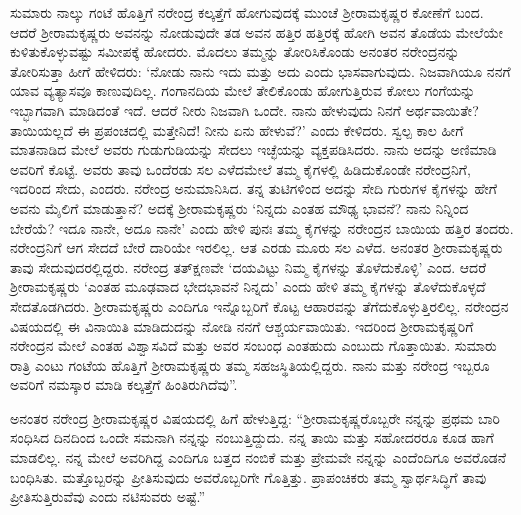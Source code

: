 ಸುಮಾರು ನಾಲ್ಕು ಗಂಟೆ ಹೊತ್ತಿಗೆ ನರೇಂದ್ರ ಕಲ್ಕತ್ತೆಗೆ ಹೋಗುವುದಕ್ಕೆ ಮುಂಚೆ ಶ‍್ರೀರಾಮಕೃಷ್ಣರ ಕೋಣೆಗೆ ಬಂದ. ಆದರೆ ಶ‍್ರೀರಾಮಕೃಷ್ಣರು ಅವನನ್ನು ನೋಡುವುದೇ ತಡ ಅವನ ಹತ್ತಿರ ಹತ್ತಿರಕ್ಕೆ ಹೋಗಿ ಅವನ ತೊಡೆಯ ಮೇಲೆಯೇ ಕುಳಿತುಕೊಳ್ಳುವಷ್ಟು ಸಮೀಪಕ್ಕೆ ಹೋದರು. ಮೊದಲು ತಮ್ಮನ್ನು ತೋರಿಸಿಕೊಂಡು ಅನಂತರ ನರೇಂದ್ರನನ್ನು ತೋರಿಸುತ್ತಾ ಹೀಗೆ ಹೇಳಿದರು: ‘ನೋಡು ನಾನು ಇದು ಮತ್ತು ಅದು ಎಂದು ಭಾಸವಾಗುವುದು. ನಿಜವಾಗಿಯೂ ನನಗೆ ಯಾವ ವ್ಯತ್ಯಾಸವೂ ಕಾಣುವುದಿಲ್ಲ. ಗಂಗಾನದಿಯ ಮೇಲೆ ತೇಲಿಕೊಂಡು ಹೋಗುತ್ತಿರುವ ಕೋಲು ಗಂಗೆಯನ್ನು ಇಬ್ಭಾಗವಾಗಿ ಮಾಡಿದಂತೆ ಇದೆ. ಆದರೆ ನೀರು ನಿಜವಾಗಿ ಒಂದೇ. ನಾನು ಹೇಳುವುದು ನಿನಗೆ ಅರ್ಥವಾಯಿತೇ? ತಾಯಿಯಲ್ಲದೆ ಈ ಪ್ರಪಂಚದಲ್ಲಿ ಮತ್ತೇನಿದೆ! ನೀನು ಏನು ಹೇಳುವೆ?’ ಎಂದು ಕೇಳಿದರು. ಸ್ವಲ್ಪ ಕಾಲ ಹೀಗೆ ಮಾತನಾಡಿದ ಮೇಲೆ ಅವರು ಗುಡುಗುಡಿಯನ್ನು ಸೇದಲು ಇಚ್ಛೆಯನ್ನು ವ್ಯಕ್ತಪಡಿಸಿದರು. ನಾನು ಅದನ್ನು ಅಣಿಮಾಡಿ ಅವರಿಗೆ ಕೊಟ್ಟೆ. ಅವರು ತಾವು ಒಂದೆರಡು ಸಲ ಎಳೆದಮೇಲೆ ತಮ್ಮ ಕೈಗಳಲ್ಲಿ ಹಿಡಿದುಕೊಂಡೇ ನರೇಂದ್ರನಿಗೆ, ಇದರಿಂದ ಸೇದು, ಎಂದರು. ನರೇಂದ್ರ ಅನುಮಾನಿಸಿದ. ತನ್ನ ತುಟಿಗಳಿಂದ ಅದನ್ನು ಸೇದಿ ಗುರುಗಳ ಕೈಗಳನ್ನು ಹೇಗೆ ಅವನು ಮೈಲಿಗೆ ಮಾಡುತ್ತಾನೆ? ಅದಕ್ಕೆ ಶ‍್ರೀರಾಮಕೃಷ್ಣರು ‘ನಿನ್ನದು ಎಂತಹ ಮೌಢ್ಯ ಭಾವನೆ? ನಾನು ನಿನ್ನಿಂದ ಬೇರೆಯೆ? ಇದೂ ನಾನೇ, ಅದೂ ನಾನೇ’ ಎಂದು ಹೇಳಿ ಪುನಃ ತಮ್ಮ ಕೈಗಳನ್ನು ನರೇಂದ್ರನ ಬಾಯಿಯ ಹತ್ತಿರ ತಂದರು. ನರೇಂದ್ರನಿಗೆ ಆಗ ಸೇದದೆ ಬೇರೆ ದಾರಿಯೇ ಇರಲಿಲ್ಲ. ಆತ ಎರಡು ಮೂರು ಸಲ ಎಳೆದ. ಅನಂತರ ಶ‍್ರೀರಾಮಕೃಷ್ಣರು ತಾವು ಸೇದುವುದರಲ್ಲಿದ್ದರು. ನರೇಂದ್ರ ತತ್‍ಕ್ಷಣವೇ ‘ದಯವಿಟ್ಟು ನಿಮ್ಮ ಕೈಗಳನ್ನು ತೊಳೆದುಕೊಳ್ಳಿ’ ಎಂದ. ಆದರೆ ಶ‍್ರೀರಾಮಕೃಷ್ಣರು ‘ಎಂತಹ ಮೂಢವಾದ ಭೇದಭಾವನೆ ನಿನ್ನದು’ ಎಂದು ಹೇಳಿ ತಮ್ಮ ಕೈಗಳನ್ನು ತೊಳೆದುಕೊಳ್ಳದೆ ಸೇದತೊಡಗಿದರು. ಶ‍್ರೀರಾಮಕೃಷ್ಣರು ಎಂದಿಗೂ ಇನ್ನೊಬ್ಬರಿಗೆ ಕೊಟ್ಟ ಆಹಾರವನ್ನು ತೆಗೆದುಕೊಳ್ಳುತ್ತಿರಲಿಲ್ಲ. ನರೇಂದ್ರನ ವಿಷಯದಲ್ಲಿ ಈ ವಿನಾಯಿತಿ ಮಾಡಿದುದನ್ನು ನೋಡಿ ನನಗೆ ಆಶ್ಚರ್ಯವಾಯಿತು. ಇದರಿಂದ ಶ‍್ರೀರಾಮಕೃಷ್ಣರಿಗೆ ನರೇಂದ್ರನ ಮೇಲೆ ಎಂತಹ ವಿಶ್ವಾಸವಿದೆ ಮತ್ತು ಅವರ ಸಂಬಂಧ ಎಂತಹುದು ಎಂಬುದು ಗೊತ್ತಾಯಿತು. ಸುಮಾರು ರಾತ್ರಿ ಎಂಟು ಗಂಟೆಯ ಹೊತ್ತಿಗೆ ಶ‍್ರೀರಾಮಕೃಷ್ಣರು ತಮ್ಮ ಸಹಜಸ್ಥಿತಿಯಲ್ಲಿದ್ದರು. ನಾನು ಮತ್ತು ನರೇಂದ್ರ ಇಬ್ಬರೂ ಅವರಿಗೆ ನಮಸ್ಕಾರ ಮಾಡಿ ಕಲ್ಕತ್ತೆಗೆ ಹಿಂತಿರುಗಿದೆವು”.

ಅನಂತರ ನರೇಂದ್ರ ಶ‍್ರೀರಾಮಕೃಷ್ಣರ ವಿಷಯದಲ್ಲಿ ಹಿಗೆ ಹೇಳುತ್ತಿದ್ದ: “ಶ‍್ರೀರಾಮಕೃಷ್ಣರೊಬ್ಬರೇ ನನ್ನನ್ನು ಪ್ರಥಮ ಬಾರಿ ಸಂಧಿಸಿದ ದಿನದಿಂದ ಒಂದೇ ಸಮನಾಗಿ ನನ್ನನ್ನು ನಂಬುತ್ತಿದ್ದುದು. ನನ್ನ ತಾಯಿ ಮತ್ತು ಸಹೋದರರೂ ಕೂಡ ಹಾಗೆ ಮಾಡಲಿಲ್ಲ. ನನ್ನ ಮೇಲೆ ಅವರಿಗಿದ್ದ ಎಂದಿಗೂ ಬತ್ತದ ನಂಬಿಕೆ ಮತ್ತು ಪ್ರೇಮವೇ ನನ್ನನ್ನು ಎಂದೆಂದಿಗೂ ಅವರೊಡನೆ ಬಂಧಿಸಿತು. ಮತ್ತೊಬ್ಬರನ್ನು ಪ್ರೀತಿಸುವುದು ಅವರೊಬ್ಬರಿಗೇ ಗೊತ್ತಿತ್ತು. ಪ್ರಾಪಂಚಿಕರು ತಮ್ಮ ಸ್ವಾರ್ಥಸಿದ್ಧಿಗೆ ತಾವು ಪ್ರೀತಿಸುತ್ತಿರುವೆವು ಎಂದು ನಟಿಸುವರು ಅಷ್ಟೆ.”

